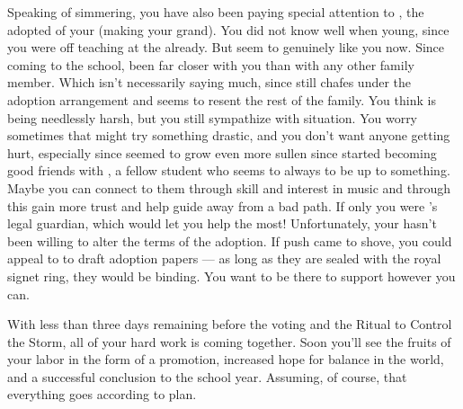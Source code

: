 \documentclass[char]{GL2020}
\begin{document}
Speaking of simmering, you have also been paying special attention to \cAdopted{\full}, the adopted \cAdopted{\offspring} of your \cAdoptedParentOne{\nibling} (making \cAdopted{} your grand\cAdopted{\nibling}). You did not know \cAdopted{} well when \cAdopted{\they \were} young, since you were off teaching at the \pSc{} already. But \cAdopted{\they} seem\cAdopted{\verbs} to genuinely like you now. Since coming to the school, \cAdopted{\they} \cAdopted{\have} been far closer with you than with any other family member. Which isn't necessarily saying much, since \cAdopted{} still chafes under the adoption arrangement and seems to resent the rest of the family. You think \cAdopted{} is being needlessly harsh, but you still sympathize with \cAdopted{\their} situation. You worry sometimes that \cAdopted{} might try something drastic, and you don't want anyone getting hurt, especially since \cAdopted{\they \have} seemed to grow even more sullen since \cAdopted{\they} started becoming good friends with \cLibAssist{\full}, a fellow \pFarm{} student who seems to always to be up to something. Maybe you can connect to them through \cAdopted{\their} skill and interest in music and through this gain more trust and help guide \cAdopted{\them} away from a bad path. If only you were \cAdopted{}’s legal guardian, which would let you help the most! Unfortunately, your \cAdoptedParentOne{\nibling} hasn't been willing to alter the terms of the adoption. If push came to shove, you could appeal to \cPrince{\full} to draft adoption papers — as long as they are sealed with the royal signet ring, they would be binding. You want to be there to support \cAdopted{} however you can. 

With less than three days remaining before the voting and the Ritual to Control the Storm, all of your hard work is coming together. Soon you'll see the fruits of your labor in the form of a promotion, increased hope for balance in the world, and a successful conclusion to the school year. Assuming, of course, that everything goes according to plan.
\end{document}
